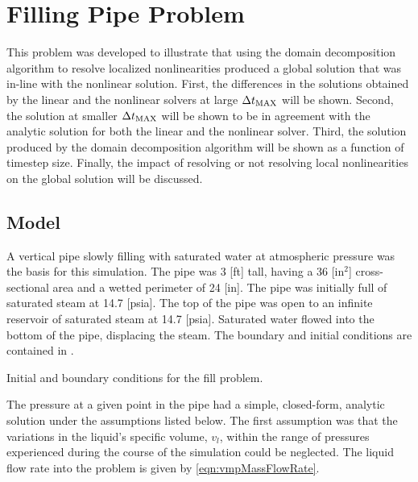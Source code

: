 \FloatBarrier
\section{Filling Pipe Problem}
\label{sect:vmp}
This problem was developed to illustrate that using the domain decomposition algorithm to resolve localized nonlinearities produced a global solution that was in-line with the nonlinear solution.
First, the differences in the solutions obtained by the linear and the nonlinear solvers at large $\dtmax{}$ will be shown.
Second, the solution at smaller $\dtmax{}$ will be shown to be in agreement with the analytic solution for both the linear and the nonlinear solver.
Third, the solution produced by the domain decomposition algorithm will be shown as a function of timestep size.
Finally, the impact of resolving or not resolving local nonlinearities on the global solution will be discussed.

\subsection{Model}
\label{subsect:vmpModel}

A vertical pipe slowly filling with saturated water at atmospheric pressure was the basis for this simulation.
The pipe was 3 [ft] tall, having a 36 [in$^{2}$] cross-sectional area and a wetted perimeter of 24 [in].
The pipe was initially full of saturated steam at 14.7 [psia].
The top of the pipe was open to an infinite reservoir of saturated steam at 14.7 [psia].
Saturated water flowed into the bottom of the pipe, displacing the steam.
The boundary and initial conditions are contained in .

\begin{table}[h!tb]
\centering
\singlespace

\caption{Initial and boundary conditions for the fill problem.}
\label{tab:vmpBCIC}
\end{table}

The pressure at a given point in the pipe had a simple, closed-form, analytic solution under the assumptions listed below.
The first assumption was that the variations in the liquid's specific volume, $v_{l}$, within the range of pressures experienced during the course of the simulation could be neglected.
The liquid flow rate into the problem is given by \eqref{eqn:vmpMassFlowRate}.

